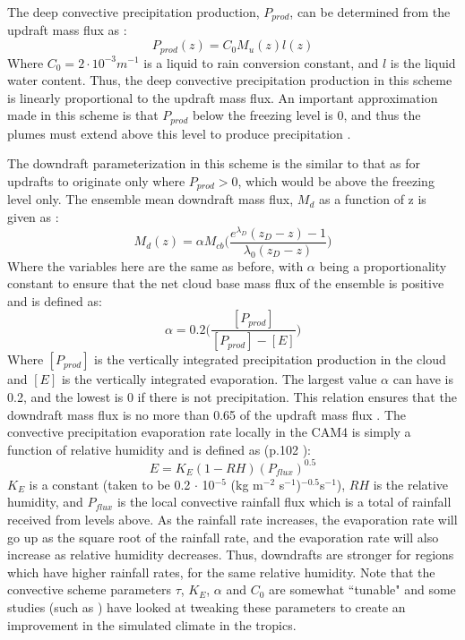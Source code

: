 \documentclass[letterpaper,12pt,titlepage,oneside,final]{book}
\begin{document}
The deep convective precipitation production, $P_{prod}$, can be determined from the updraft mass flux as \citep{zhang_sensitivity_1995}:
\begin{equation}\label{eq:pprod}
P_{prod}(z)=C_{0}M_{u}(z)l(z)
\end{equation}
Where $C_{0}=2\cdot{10^{-3}} m^{-1}$ is a liquid to rain conversion constant, and $l$ is the liquid water content. Thus, the deep convective precipitation production in this scheme is linearly proportional to the updraft mass flux. An important approximation made in this scheme is that $P_{prod}$ below the freezing level is 0, and thus the plumes must extend above this level to produce precipitation \citep{zhang_sensitivity_1995}.

The downdraft parameterization in this scheme is the similar to that as for updrafts to originate only where $P_{prod} > 0$, which would be above the freezing level only. The ensemble mean downdraft mass flux, $M_{d}$ as a function of z is given as \citep{zhang_sensitivity_1995}:
\begin{equation}\label{eq:down}
M_{d}(z)=\alpha{M_{cb}}\Bigg(\frac{e^{\lambda_{D}}(z_{D}-z)-1}{\lambda_{0}(z_{D}-z)}\Bigg)
\end{equation}
Where the variables here are the same as before, with $\alpha$ being a proportionality constant to ensure that the net cloud base mass flux of the ensemble is positive and is defined as:
\begin{equation}
\alpha=0.2\Bigg(\frac{[P_{prod}]}{[P_{prod}]-[E]}\Bigg)
\end{equation}
Where $[P_{prod}]$ is the vertically integrated precipitation production in the cloud and $[E]$ is the vertically integrated evaporation. The largest value $\alpha$ can have is 0.2, and the lowest is 0 if there is not precipitation. This relation ensures that the downdraft mass flux is no more than 0.65 of the updraft mass flux \citep{zhang_sensitivity_1995}. The convective precipitation evaporation rate locally in the CAM4 is simply a function of relative humidity and is defined as (p.102 \cite{neale_description_2010}):
\begin{equation}\label{eq:zmevap}
E=K_{E}(1-RH)(P_{flux})^{0.5}
\end{equation}
$K_{E}$ is a constant (taken to be 0.2 $\cdot$ 10$^{-5}$ (kg m$^{-2}$ s$^{-1}$)$^{-0.5}$s$^{-1}$), $RH$ is the relative humidity, and $P_{flux}$ is the local convective rainfall flux which is a total of rainfall received from levels above. As the rainfall rate increases, the evaporation rate will go up as the square root of the rainfall rate, and the evaporation rate will also increase as relative humidity decreases. Thus, downdrafts are stronger for regions which have higher rainfall rates, for the same relative humidity. Note that the convective scheme parameters $\tau$, $K_{E}$, $\alpha$ and $C_{0}$ are somewhat ``tunable" and some studies (such as \cite{yang_uncertainty_2013}) have looked at tweaking these parameters to create an improvement in the simulated climate in the tropics.
\end{document}

